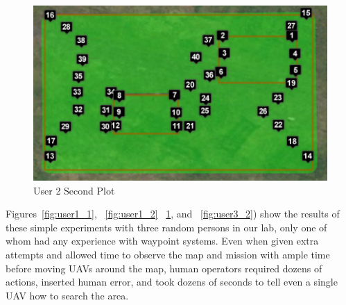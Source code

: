 \documentclass{sig-alternate-ipsn13}
\begin{document}
\fi

\begin{figure}[h]
  \centering
  \includegraphics[scale=0.5]{user_waypoints_4}
  \caption{User 2 Second Plot}
  \label{fig:user2_2}
\end{figure}

Figures~\ref{fig:user1_1}, ~\ref{fig:user1_2}
~\ref{fig:user2_2}, and ~\ref{fig:user3_2}) show the results of these
simple experiments with three random persons in our lab, only one of whom
had any experience with waypoint systems. Even when given extra attempts
and allowed time to observe the map and mission with ample time before
moving UAVs around the map, human operators required dozens of actions,
inserted human error, and took dozens of seconds to tell even a single UAV
how to search the area.

\end{document}
